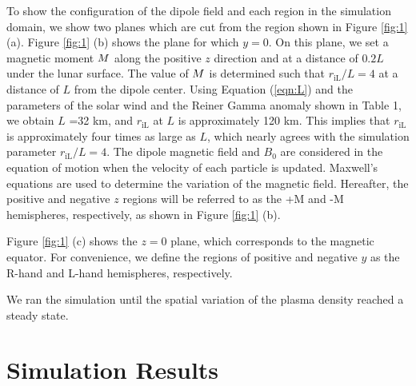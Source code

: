 \documentclass[draft,jgrga]{agutex2015}
\begin{document}
\begin{article}
To show the configuration of the dipole field and each region 
in the simulation domain, 
we show two planes which are cut from the region shown in Figure \ref{fig:1} (a).
Figure \ref{fig:1} (b) shows the plane for which $y=0$.
On this plane, we set 
a magnetic moment 
$\mbox{\boldmath $M$}$ 
along the positive $z$ direction and
at a distance of $0.2L$ under the lunar surface.
The value of 
$\mbox{\boldmath $M$}$ 
is determined such that $r_\mathrm{iL}/L =4$ at a distance of $L$ from the dipole center.
Using Equation (\ref{eqn:L}) and the parameters of the solar wind and the
Reiner Gamma anomaly shown in Table 1,
we obtain $L$ =32 km, and $r_\mathrm{iL}$ at $L$ is approximately 120 km. 
This implies that 
$r_\mathrm{iL}$ is approximately four times as large as $L$,
which nearly agrees with the simulation parameter $r_\mathrm{iL}/L =4$.
The dipole magnetic field and $B_\mathrm{0}$
are considered in the equation of motion 
when the velocity of each particle is updated. 
Maxwell's equations are used to determine the variation of the magnetic field.
Hereafter, the positive and negative $z$ regions will be referred to as the
+M and -M hemispheres, respectively, as shown in Figure \ref{fig:1} (b).

Figure \ref{fig:1} (c) shows the $z=0$ plane,
which corresponds to the magnetic equator.
For convenience, 
we define the regions of positive and negative $y$ as the R-hand and L-hand 
hemispheres, respectively.

We ran the simulation until the spatial variation of the plasma density reached a steady state. 
%



\section{Simulation Results}


\end{article}
\end{document}
